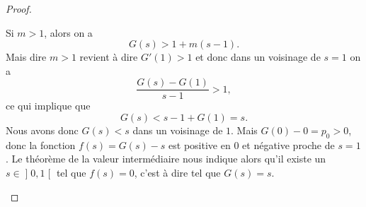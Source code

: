\begin{proof}
\begin{subproof}
    Si \( m>1\), alors on a
    \begin{equation}
        G(s)>1+m(s-1).
    \end{equation}
    Mais dire \( m>1\) revient à dire \( G'(1)>1\) et donc dans un voisinage de \( s=1\) on a
    \begin{equation}
        \frac{ G(s)-G(1) }{ s-1 }>1,
    \end{equation}
    ce qui implique que
    \begin{equation}
        G(s)<s-1+G(1)=s.
    \end{equation}
    Nous avons donc \( G(s)<s\) dans un voisinage de \( 1\). Mais \( G(0)-0=p_0>0\), donc la fonction \( f(s)=G(s)-s\) est positive en \( 0\) et négative proche de \( s=1\). Le théorème de la valeur intermédiaire nous indique alors qu'il existe un \( s\in \mathopen] 0 , 1 \mathclose[\) tel que \( f(s)=0\), c'est à dire tel que \( G(s)=s\).
    \end{subproof}
\end{proof}
